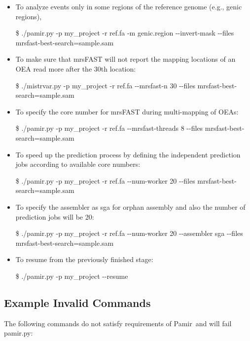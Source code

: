 \documentclass{article}
\newcommand{\toolName}{Pamir~}
\begin{document}
\begin{itemize}
\item To analyze events only in some regions of the reference genome (e.g., genic regions), 
\begin{flushleft}
\$ ./pamir.py -p my\_project -r ref.fa -m genic.region -{}-invert-mask  -{}-files mrsfast-best-search=sample.sam
\end{flushleft}

\item To make sure that mrsFAST will not report the mapping locations of an OEA read more after the 30th location:
\begin{flushleft}
\$ ./mistrvar.py -p my\_project -r ref.fa -{}-mrsfast-n 30 -{}-files mrsfast-best-search=sample.sam
\end{flushleft}

\item To specify the core number for mrsFAST during multi-mapping of OEAs: 
\begin{flushleft}
\$ ./pamir.py -p my\_project -r ref.fa  -{}-mrsfast-threads 8 -{}-files mrsfast-best-search=sample.sam
\end{flushleft}

\item To speed up the prediction process by defining the independent prediction jobs according to available core numbers: 
\begin{flushleft}
\$ ./pamir.py -p my\_project -r ref.fa  -{}-num-worker 20 -{}-files mrsfast-best-search=sample.sam
\end{flushleft}

\item To specify the assembler as sga for orphan assembly and also the number of prediction jobs will be 20: 
\begin{flushleft}
\$ ./pamir.py -p my\_project -r ref.fa  -{}-num-worker 20 -{}-assembler sga -{}-files mrsfast-best-search=sample.sam
\end{flushleft}

\item To resume from the previously finished stage: 
\begin{flushleft}
\$ ./pamir.py -p my\_project -{}-resume
\end{flushleft}

\end{itemize}

\subsection{Example Invalid Commands}
The following commands do not satisfy requirements of \toolName and will fail pamir.py:
\end{document}
